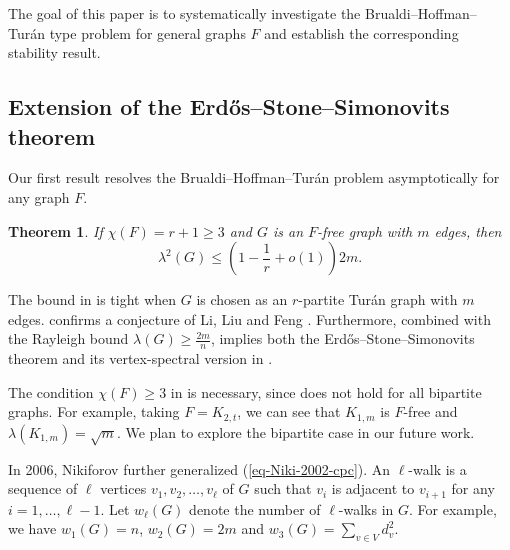 \documentclass[11pt,a4paper]{article}
\newtheorem{theorem}{Theorem}[section]
\theoremstyle{definition}
\theoremstyle{remark}
\begin{document}


The goal of this paper is to systematically investigate the Brualdi--Hoffman--Tur\'{a}n type problem for general graphs $F$ and establish the corresponding stability result. 




\subsection{Extension of the Erd\H{o}s--Stone--Simonovits theorem}



Our first result resolves the Brualdi--Hoffman--Tur\'{a}n  problem asymptotically for any graph $F$. 

\begin{theorem} \label{conj-LLF}
If $\chi (F) = r+1 \ge 3$ and $G$ is an $F$-free graph with $m$ edges, then 
$$\lambda^2 (G)\le \left(1-\frac{1}{r} + o(1)\right)2m.$$ 
\end{theorem} 

The bound in  is tight 
when $G$ is chosen as an $r$-partite Tur\'{a}n graph with $m$ edges. 
 confirms a conjecture of Li, Liu and Feng \cite[Conjecture 1.31]{LLF2022}. Furthermore, combined with the Rayleigh bound $\lambda(G) \geq \frac{2m}{n}$,   implies both the Erd\H{o}s--Stone--Simonovits theorem and its vertex-spectral version in . 



The condition $\chi (F)\ge 3$ in  
is necessary, since  does not hold for all bipartite graphs. 
For example, taking $F=K_{2,t}$,  
we can see that $K_{1,m}$ is $F$-free and $\lambda (K_{1,m})= \sqrt{m}$.  
We plan to explore the bipartite case in our future work. 

In 2006, 
Nikiforov \cite{Niki2006-walks} further generalized (\ref{eq-Niki-2002-cpc}). 
An $\ell$-walk is a sequence of $\ell$ 
vertices $v_1,v_2,\ldots ,v_{\ell}$ of $G$ such that 
$v_i$ is adjacent to $v_{i+1}$ for any $i=1,\ldots ,\ell -1$. 
Let $w_{\ell}(G)$ denote the number of $\ell$-walks in $G$. For example, we have $w_1(G)=n$, $w_2(G)=2m$ and
$w_3(G) = \sum_{v\in V}d_v^2$. 
\end{document}
